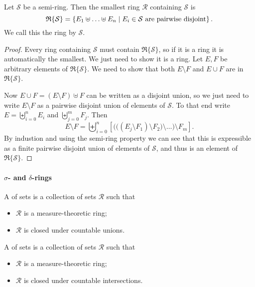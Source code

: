 \begin{lemma}
Let $\mathcal{S}$ be a semi-ring. Then the smallest ring $\mathcal{R}$ containing $\mathcal{S}$ is
\[ \mathfrak{R}\{\mathcal{S}\} = \left\{ E_1\uplus\ldots\uplus E_n \;\middle|\; \text{$E_i\in \mathcal{S}$ are pairwise disjoint} \right\}. \]
We call this the ring  by $\mathcal{S}$.
\end{lemma}
\begin{proof}
Every ring containing $\mathcal{S}$ must contain $\mathfrak{R}\{\mathcal{S}\}$, so if it is a ring it is automatically the smallest. We just need to show it is a ring. Let $E,F$ be arbitrary elements of $\mathfrak{R}\{\mathcal{S}\}$. We need to show that both $E\setminus F$ and $E\cup F$ are in $\mathfrak{R}\{\mathcal{S}\}$.

Now $E\cup F = (E\setminus F) \uplus F$ can be written as a disjoint union, so we just need to write $E\setminus F$ as a pairwise disjoint union of elements of $\mathcal{S}$. To that end write $E = \biguplus_{i=0}^nE_i$ and $\biguplus_{j= 0}^mF_j$. Then
\[ E\setminus F = \biguplus_{i=0}^n \left[ \Big(\big((E_j\setminus F_1)\setminus F_2\big)\setminus \ldots\Big)\setminus F_m \right]. \]
By industion and using the semi-ring property we can see that this is expressible as a finite pairwise disjoint union of elements of $\mathcal{S}$, and thus is an element of $\mathfrak{R}\{\mathcal{S}\}$.
\end{proof}

\paragraph{$\sigma$- and $\delta$-rings}
\begin{definition}
A  of sets is a collection of sets $\mathcal{R}$ such that
\begin{itemize}
\item $\mathcal{R}$ is a measure-theoretic ring;
\item $\mathcal{R}$ is closed under countable unions.
\end{itemize}
A  of sets is a collection of sets $\mathcal{R}$ such that
\begin{itemize}
\item $\mathcal{R}$ is a measure-theoretic ring;
\item $\mathcal{R}$ is closed under countable intersections.
\end{itemize}
\end{definition}

